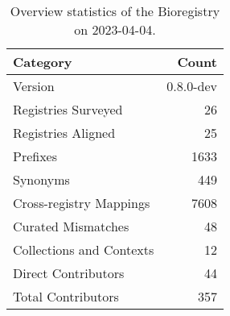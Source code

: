 \begin{table}
\caption{Overview statistics of the Bioregistry on 2023-04-04.}
\label{tab:bioregistry-summary}
\begin{tabular}{lr}
\toprule
Category & Count \\
\midrule
Version & 0.8.0-dev \\
Registries Surveyed & 26 \\
Registries Aligned & 25 \\
Prefixes & 1633 \\
Synonyms & 449 \\
Cross-registry Mappings & 7608 \\
Curated Mismatches & 48 \\
Collections and Contexts & 12 \\
Direct Contributors & 44 \\
Total Contributors & 357 \\
\bottomrule
\end{tabular}
\end{table}
